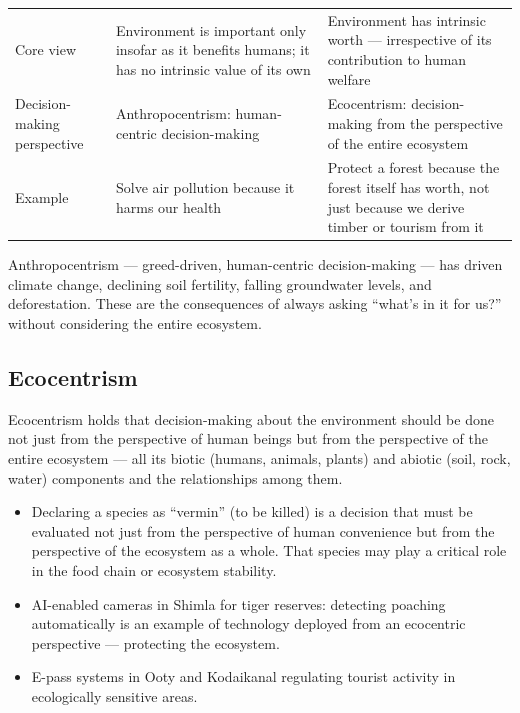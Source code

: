\begin{center}
\begin{tabularx}{\textwidth}{>{\raggedright\arraybackslash}p{2.8cm} Y Y}
 &  &  \\
\toprule
Core view & Environment is important only insofar as it benefits humans; it has no intrinsic value of its own & Environment has intrinsic worth --- irrespective of its contribution to human welfare \\
Decision-making perspective & Anthropocentrism: human-centric decision-making & Ecocentrism: decision-making from the perspective of the entire ecosystem \\
Example & Solve air pollution because it harms our health & Protect a forest because the forest itself has worth, not just because we derive timber or tourism from it \\
\bottomrule
\end{tabularx}
\end{center}

\begin{CriticalPoint}
Anthropocentrism --- greed-driven, human-centric decision-making --- has driven climate change, declining soil fertility, falling groundwater levels, and deforestation. These are the consequences of always asking ``what's in it for us?'' without considering the entire ecosystem.
\end{CriticalPoint}

\subsection{Ecocentrism}

Ecocentrism holds that decision-making about the environment should be done not just from the perspective of human beings but from the perspective of the entire ecosystem --- all its biotic (humans, animals, plants) and abiotic (soil, rock, water) components and the relationships among them.

\begin{ExampleBox}
\begin{itemize}
\item Declaring a species as ``vermin'' (to be killed) is a decision that must be evaluated not just from the perspective of human convenience but from the perspective of the ecosystem as a whole. That species may play a critical role in the food chain or ecosystem stability.
\item AI-enabled cameras in Shimla for tiger reserves: detecting poaching automatically is an example of technology deployed from an ecocentric perspective --- protecting the ecosystem.
\item E-pass systems in Ooty and Kodaikanal regulating tourist activity in ecologically sensitive areas.
\end{itemize}
\end{ExampleBox}

